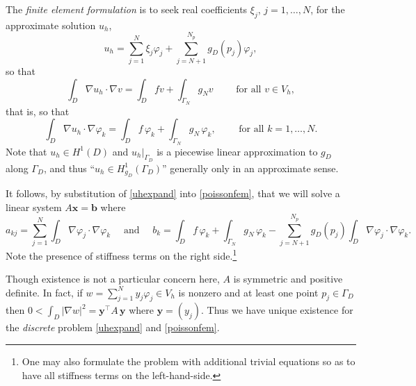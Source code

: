 \documentclass[12pt]{amsart}
\theoremstyle{definition}
\newcommand{\bb}{\mathbf{b}}
\newcommand{\bx}{\mathbf{x}}
\newcommand{\by}{\mathbf{y}}
\newcommand{\grad}{\nabla}
\newcommand{\vf}{\varphi}
\begin{document}
The \emph{finite element formulation} is to seek real coefficients $\xi_j$, $j=1,\dots,N$, for the approximate solution $u_h$,
\begin{equation}\label{uhexpand}
u_h = \sum_{j=1}^N \xi_j \vf_j + \sum_{j=N+1}^{N_p} g_D(p_j) \vf_j,
\end{equation}
so that
    $$\int_D \grad u_h \cdot \grad v = \int_D f v + \int_{\Gamma_N} g_N v \qquad \text{ for all } v\in V_h,$$
that is, so that
\begin{equation}\label{poissonfem}
\int_D \grad u_h\cdot \grad \vf_k = \int_D f \,\vf_k + \int_{\Gamma_N} g_N \,\vf_k, \qquad \text{ for all } k=1,\dots,N.
\end{equation}
Note that $u_h\in H^1(D)$ and $u_h\big|_{\Gamma_D}$ is a piecewise linear approximation to $g_D$ along $\Gamma_D$, and thus ``$u_h\in H_{g_D}^1(\Gamma_D)$'' generally only in an approximate sense.

It follows, by substitution of \eqref{uhexpand} into \eqref{poissonfem}, that we will solve a linear system $A\bx=\bb$ where
    $$a_{kj} = \sum_{j=1}^N \int_D \grad \vf_j\cdot \grad \vf_k \quad \text{ and } \quad b_k = \int_D f \,\vf_k + \int_{\Gamma_N} g_N \,\vf_k - \sum_{j=N+1}^{N_p} g_D(p_j) \int_D \grad \vf_j\cdot \grad \vf_k.$$
Note the presence of stiffness terms on the right side.\footnote{One may also formulate the problem with additional trivial equations so as to have all stiffness terms on the left-hand-side.}

Though existence is not a particular concern here,  $A$ is symmetric and positive definite.  In fact, if $w=\sum_{j=1}^N y_j \vf_j\in V_h$ is nonzero and at least one point $p_j\in \Gamma_D$ then $0<\int_D |\grad w|^2 = \by^\top A \,\by$ where $\by=(y_j)$.  Thus we have unique existence for the \emph{discrete} problem \eqref{uhexpand} and \eqref{poissonfem}.
\end{document}
